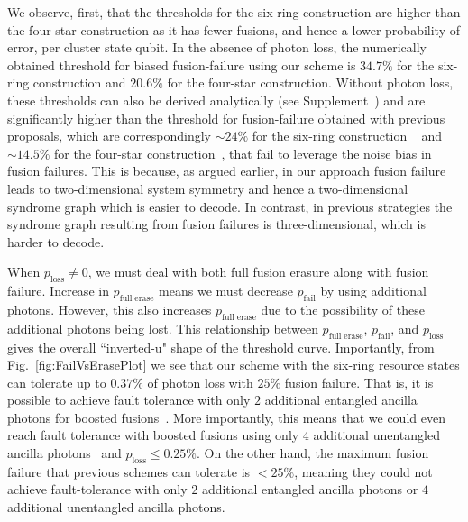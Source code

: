 \documentclass[reprint,
groupedaddress,
 prl,amsmath,amssymb,
 aps]{revtex4-2}
\theoremstyle{definition}
\begin{document}
\begin{bibunit}
{We} observe, {first}, that the thresholds for the six-ring construction are higher than the four-star construction as it has fewer fusions, and hence a lower probability of error, per cluster state qubit. In the absence of photon loss, the numerically obtained threshold for biased fusion-failure using our scheme is $34.7\%$ for the six-ring construction and $20.6\%$ for the four-star construction. {Without photon loss, these thresholds can also be derived analytically (see Supplement~\cite{supplement})} and are significantly higher than the threshold for fusion-failure obtained with previous proposals, which are correspondingly $\sim 24\%$ for the six-ring construction ~\cite{bartolucci2021fusion} and $\sim14.5\%$ for the four-star construction~\cite{auger2018fault}, {{that fail to leverage the noise bias in fusion failures}}. This is because, as argued earlier, in our approach fusion failure leads to two-dimensional system symmetry and hence a two-dimensional syndrome graph which is easier to decode. In contrast, {in} previous strategies the syndrome graph resulting from fusion failures is three-dimensional, which is harder to decode.  

When $p_\mathrm{loss}\neq 0$, we must deal with both full fusion erasure along with fusion failure. Increase in $p_\mathrm{full\; erase}$ means we must decrease $p_\mathrm{fail}$ by using additional photons. However, this also increases $p_\mathrm{full\; erase}$ due to the possibility of these additional photons being lost. This relationship  between $p_\mathrm{full\; erase}$, $p_\mathrm{fail}$, and $p_\mathrm{loss}$ gives the overall ``inverted-u" shape of the threshold curve. Importantly, from Fig.~\ref{fig:FailVsErasePlot} we see that our scheme with the six-ring resource states can tolerate up to $ 0.37\%$ of photon loss with $25\%$ fusion failure. That is, it is possible to achieve fault tolerance with only $2$ additional entangled ancilla photons for boosted fusions~\cite{grice2011arbitrarily}. More importantly, this means that we could even reach fault tolerance with boosted fusions using only $4$ additional unentangled ancilla photons~\cite{ewert20143} and { {$p_\mathrm{loss}\leq 0.25\%$}}. On the other hand, the maximum fusion failure that previous schemes can tolerate is $< 25\%$, meaning they could not achieve fault-tolerance with only $2$ additional entangled ancilla photons or $4$ additional unentangled ancilla photons. 




\end{bibunit}
\end{document}
